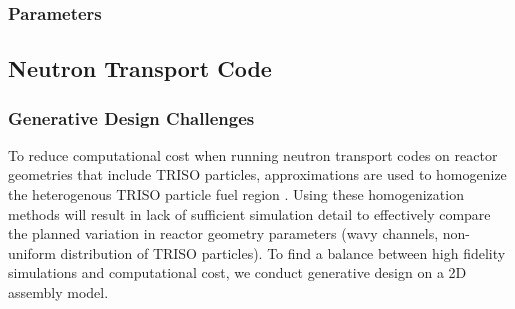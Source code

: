 \subsubsection{Parameters}

\subsection{Neutron Transport Code}

\subsubsection{Generative Design Challenges}

To reduce computational cost when running neutron transport codes on 
reactor geometries that include \gls{TRISO} particles, approximations 
are used to homogenize the heterogenous \gls{TRISO} particle fuel region 
\cite{ramey_monte_2018}. 
Using these homogenization methods will result in lack of sufficient simulation detail 
to effectively compare the planned variation in reactor geometry parameters (wavy 
channels, non-uniform distribution of \gls{TRISO} particles).
To find a balance between high fidelity simulations and computational cost, we conduct 
generative design on a 2D assembly model. 





